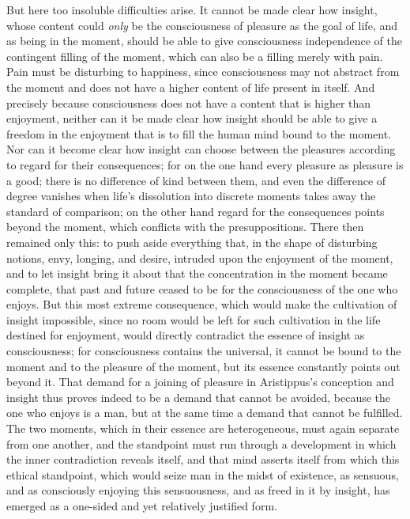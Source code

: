 But here too insoluble difficulties arise. It cannot
be made clear how insight, whose content could \emph{only}
be the consciousness of pleasure as the goal of life, and as
being in the moment, should be able to give consciousness independence of the contingent filling of the moment, which can also
be a filling merely with pain. Pain must be
disturbing to happiness, since consciousness may not abstract
from the moment and does not have a higher content of life present
in itself. And precisely because consciousness does not have a content that
is higher than enjoyment, neither can it be made clear how insight should be able to give a freedom in the enjoyment
that is to fill the human mind bound to the moment.
Nor can it become clear how insight can choose
between the pleasures according to regard for their consequences; for on the one hand
every pleasure as pleasure is a good; there is no difference of kind
between them, and even the difference of degree vanishes when life's
dissolution into discrete moments takes away the standard of comparison;
on the other hand regard for the consequences points beyond the moment,
which conflicts with the presuppositions. There then remained only
this: to push aside everything that, in the shape of disturbing
notions, envy, longing, and desire, intruded
upon the enjoyment of the moment, and to let insight bring it about that the concentration in the moment became complete, that past and future ceased to be for the consciousness of the one who enjoys. But this
most extreme consequence, which would make the cultivation of insight impossible, since no room would be left for such cultivation in the life destined for
enjoyment, would directly contradict the essence of insight
as consciousness; for consciousness contains the universal, it
cannot be bound to the moment and to the pleasure of the moment, but
its essence constantly points out beyond it. That demand for
a joining of pleasure in Aristippus's conception and insight thus proves indeed to be a demand that cannot be avoided, because the one who enjoys is a man, but at the same time a
demand that cannot be fulfilled. The two moments, which in
their essence are heterogeneous, must again separate from one another,
and the standpoint must run through a development in which the
inner contradiction reveals itself, and that mind asserts itself from which this ethical standpoint, which would seize
man in the midst of existence, as sensuous, and as consciously
enjoying this sensuousness, and as freed in it by insight, has emerged as a one-sided and yet relatively justified
form.

